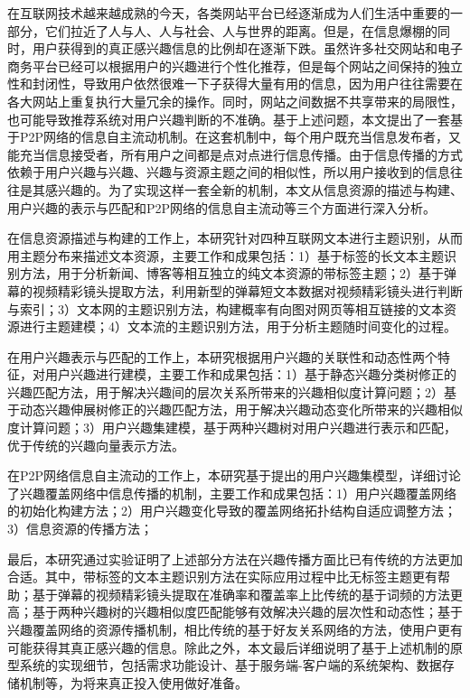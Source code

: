 
\begin{cabstract}
在互联网技术越来越成熟的今天，各类网站平台已经逐渐成为人们生活中重要的一部分，它们拉近了人与人、人与社会、人与世界的距离。但是，在信息爆棚的同时，用户获得到的真正感兴趣信息的比例却在逐渐下跌。虽然许多社交网站和电子商务平台已经可以根据用户的兴趣进行个性化推荐，但是每个网站之间保持的独立性和封闭性，导致用户依然很难一下子获得大量有用的信息，因为用户往往需要在各大网站上重复执行大量冗余的操作。同时，网站之间数据不共享带来的局限性，也可能导致推荐系统对用户兴趣判断的不准确。基于上述问题，本文提出了一套基于P2P网络的信息自主流动机制。在这套机制中，每个用户既充当信息发布者，又能充当信息接受者，所有用户之间都是点对点进行信息传播。由于信息传播的方式依赖于用户兴趣与兴趣、兴趣与资源主题之间的相似性，所以用户接收到的信息往往是其感兴趣的。为了实现这样一套全新的机制，本文从信息资源的描述与构建、用户兴趣的表示与匹配和P2P网络的信息自主流动等三个方面进行深入分析。

在信息资源描述与构建的工作上，本研究针对四种互联网文本进行主题识别，从而用主题分布来描述文本资源，主要工作和成果包括：1）基于标签的长文本主题识别方法，用于分析新闻、博客等相互独立的纯文本资源的带标签主题；2）基于弹幕的视频精彩镜头提取方法，利用新型的弹幕短文本数据对视频精彩镜头进行判断与索引；3）文本网的主题识别方法，构建概率有向图对网页等相互链接的文本资源进行主题建模；4）文本流的主题识别方法，用于分析主题随时间变化的过程。

在用户兴趣表示与匹配的工作上，本研究根据用户兴趣的关联性和动态性两个特征，对用户兴趣进行建模，主要工作和成果包括：1）基于静态兴趣分类树修正的兴趣匹配方法，用于解决兴趣间的层次关系所带来的兴趣相似度计算问题；2）基于动态兴趣伸展树修正的兴趣匹配方法，用于解决兴趣动态变化所带来的兴趣相似度计算问题；3）用户兴趣集建模，基于两种兴趣树对用户兴趣进行表示和匹配，优于传统的兴趣向量表示方法。

在P2P网络信息自主流动的工作上，本研究基于提出的用户兴趣集模型，详细讨论了兴趣覆盖网络中信息传播的机制，主要工作和成果包括：1）用户兴趣覆盖网络的初始化构建方法；2）用户兴趣变化导致的覆盖网络拓扑结构自适应调整方法；3）信息资源的传播方法；

最后，本研究通过实验证明了上述部分方法在兴趣传播方面比已有传统的方法更加合适。其中，带标签的文本主题识别方法在实际应用过程中比无标签主题更有帮助；基于弹幕的视频精彩镜头提取在准确率和覆盖率上比传统的基于词频的方法更高；基于两种兴趣树的兴趣相似度匹配能够有效解决兴趣的层次性和动态性；基于兴趣覆盖网络的资源传播机制，相比传统的基于好友关系网络的方法，使用户更有可能获得其真正感兴趣的信息。除此之外，本文最后详细说明了基于上述机制的原型系统的实现细节，包括需求功能设计、基于服务端-客户端的系统架构、数据存储机制等，为将来真正投入使用做好准备。

\end{cabstract}

